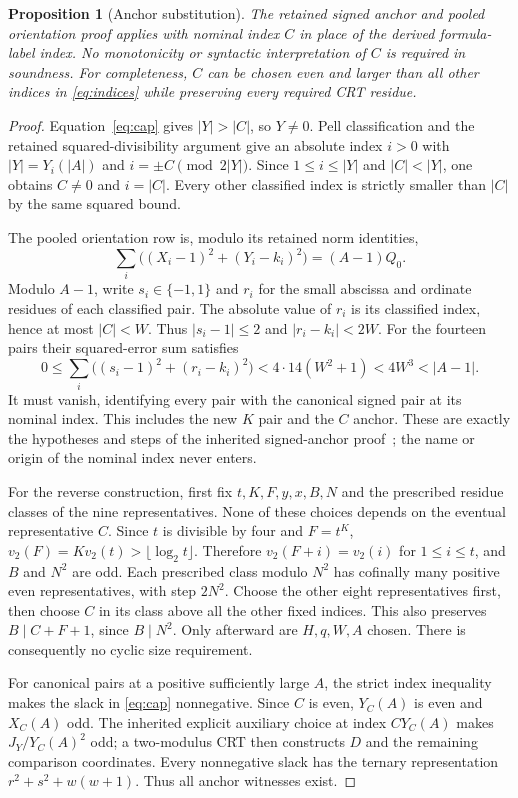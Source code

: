 \documentclass[11pt]{article}
\newtheorem{proposition}[theorem]{Proposition}
\theoremstyle{definition}\newtheorem{remark}[theorem]{Remark}
\begin{document}
\begin{proposition}[Anchor substitution]\label{prop:anchor}
The retained signed anchor and pooled orientation proof applies with
nominal index $C$ in place of the derived formula-label index. No
monotonicity or syntactic interpretation of $C$ is required in soundness.
For completeness, $C$ can be chosen even and larger than all other indices
in \eqref{eq:indices} while preserving every required CRT residue.
\end{proposition}
\begin{proof}
Equation~\eqref{eq:cap} gives $|Y|>|C|$, so $Y\ne0$. Pell
classification and the retained squared-divisibility argument give an
absolute index $i>0$ with $|Y|=Y_i(|A|)$ and
$i=\pm C\pmod{2|Y|}$. Since $1\le i\le|Y|$ and $|C|<|Y|$,
one obtains $C\ne0$ and $i=|C|$. Every other classified index is
strictly smaller than $|C|$ by the same squared bound.

The pooled orientation row is, modulo its retained norm identities,
\[
 \sum_i\bigl((X_i-1)^2+(Y_i-k_i)^2\bigr)=(A-1)Q_0.
\]
Modulo $A-1$, write $s_i\in\{-1,1\}$ and $r_i$ for the small
abscissa and ordinate residues of each classified pair. The absolute
value of $r_i$ is its classified index, hence at most $|C|<W$.
Thus $|s_i-1|\le2$ and $|r_i-k_i|<2W$. For the fourteen pairs their
squared-error sum satisfies
\[
 0\le\sum_i\bigl((s_i-1)^2+(r_i-k_i)^2\bigr)
       <4\cdot14(W^2+1)<4W^3<|A-1|.
\]
It must vanish, identifying every pair with the canonical signed pair
at its nominal index. This includes the new $K$ pair and the $C$ anchor.
These are exactly the hypotheses and steps of the inherited signed-anchor
proof~\cite{anchor}; the name or origin of the nominal index never enters.

For the reverse construction, first fix $t,K,F,y,x,B,N$ and the
prescribed residue classes of the nine representatives. None of these
choices depends on the eventual representative $C$. Since $t$ is
divisible by four and $F=t^K$, $v_2(F)=K v_2(t)>\lfloor\log_2t\rfloor$.
Therefore $v_2(F+i)=v_2(i)$ for $1\le i\le t$, and $B$ and $N^2$
are odd. Each prescribed class modulo $N^2$ has cofinally many positive
even representatives, with step $2N^2$. Choose the other eight representatives
first, then choose $C$ in its class above all the other fixed indices.
This also preserves $B\mid C+F+1$, since $B\mid N^2$.
Only afterward are $H,q,W,A$ chosen. There is consequently no cyclic
size requirement.

For canonical pairs at a positive sufficiently large $A$, the strict index
inequality makes the slack in \eqref{eq:cap} nonnegative. Since $C$ is
even, $Y_C(A)$ is even and $X_C(A)$ odd. The inherited explicit auxiliary
choice at index $C Y_C(A)$ makes $J_Y/Y_C(A)^2$ odd; a two-modulus CRT
then constructs $D$ and the remaining comparison coordinates. Every
nonnegative slack has the ternary representation
$r^2+s^2+w(w+1)$. Thus all anchor witnesses exist.
\end{proof}
\end{document}
